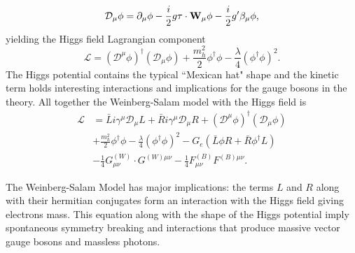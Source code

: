 \begin{equation}\mathcal{D}_\mu \phi = \partial_\mu \phi - \frac{i}{2}g\bold{\tau}\cdot\bold{W}_\mu \phi - \frac{i}{2}g'\beta_\mu\phi \text{,}\end{equation}
yielding the Higgs field Lagrangian component 
\begin{equation}\mathcal{L} = (\mathcal{D}^\mu \phi)^\dag (\mathcal{D}_\mu \phi) + \frac{m^2_h}{2}\phi^\dag \phi - \frac{\lambda}{4}(\phi^\dag\phi)^2 \text{.}\end{equation} 
The Higgs potential contains the typical ``Mexican hat" shape and the kinetic term holds interesting interactions and implications for the gauge bosons in the theory. 
All together the Weinberg-Salam model with the Higgs field is ~\cite{Lancaster:1629337}
\begin{align}
\label{eq:ws}
\mathcal{L} &= \bar{L}i \gamma^\mu \mathcal{D}_\mu L +\bar{R}i \gamma^\mu \mathcal{D}_\mu R + (\mathcal{D}^\mu \phi)^\dag(\mathcal{D}_\mu\phi)  \\
            &+\frac{m^2_h}{2}\phi^\dag \phi - \frac{\lambda}{4}(\phi^\dag\phi)^2 - G_e(\bar{L}\phi R +\bar{R}\phi^\dag L)\nonumber \\
            &-\frac{1}{4}G^{(W)}_{\mu\nu}\cdot G^{(W)\mu\nu} - \frac{1}{4}F^{(B)}_{\mu\nu} F^{(B)\mu\nu}    \text{.} 
\end{align}

The Weinberg-Salam Model has major implications: the terms $L$ and $R$ along with their hermitian conjugates form an interaction with the Higgs field giving electrons mass. 
This equation along with the shape of the Higgs potential imply spontaneous symmetry breaking and interactions that produce massive vector gauge bosons and massless photons. 

